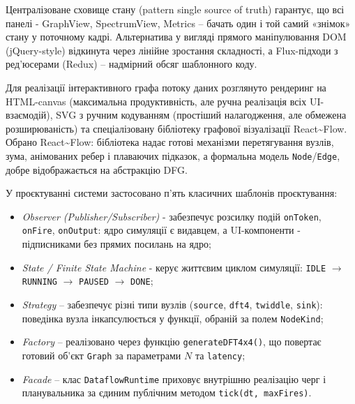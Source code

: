 \documentclass[
]{article}
\newcommand{\passthrough}[1]{#1}
\begin{document}
Централізоване сховище стану (pattern single source of truth) гарантує,
що всі панелі - GraphView, SpectrumView, Metrics -- бачать один і той
самий «знімок» стану у поточному кадрі. Альтернатива у вигляді прямого
маніпулювання DOM (jQuery-style) відкинута через лінійне зростання
складності, а Flux-підходи з ред'юсерами (Redux) -- надмірний обсяг
шаблонного коду.

Для реалізації інтерактивного графа потоку даних розглянуто рендеринг на
HTML-canvas (максимальна продуктивність, але ручна реалізація всіх
UI-взаємодій), SVG з ручним кодуванням (простіший налагодження, але
обмежена розширюваність) та спеціалізовану бібліотеку графової
візуалізації React\textasciitilde Flow. Обрано
React\textasciitilde Flow: бібліотека надає готові механізми
перетягування вузлів, зума, анімованих ребер і плаваючих підказок, а
формальна модель
\passthrough{\lstinline!Node!}/\passthrough{\lstinline!Edge!}, добре
відображається на абстракцію DFG.

У проєктуванні системи застосовано п'ять класичних шаблонів
проєктування:

\begin{itemize}
\item
  \emph{Observer (Publisher/Subscriber)} - забезпечує розсилку подій
  \passthrough{\lstinline!onToken!}, \passthrough{\lstinline!onFire!},
  \passthrough{\lstinline!onOutput!}: ядро симуляції є видавцем, а
  UI-компоненти - підписниками без прямих посилань на ядро;
\item
  \emph{State / Finite State Machine} - керує життєвим циклом симуляції:
  \passthrough{\lstinline!IDLE!} \(\rightarrow\)
  \passthrough{\lstinline!RUNNING!} \(\rightarrow\)
  \passthrough{\lstinline!PAUSED!} \(\rightarrow\)
  \passthrough{\lstinline!DONE!};
\item
  \emph{Strategy} -- забезпечує різні типи вузлів
  (\passthrough{\lstinline!source!},
  \passthrough{\lstinline!dft!}\passthrough{\lstinline!4!},
  \passthrough{\lstinline!twiddle!}, \passthrough{\lstinline!sink!}):
  поведінка вузла інкапсулюється у функції, обраній за полем
  \passthrough{\lstinline!NodeKind!};
\item
  \emph{Factory} -- реалізовано через функцію
  \passthrough{\lstinline!generateDFT!}\passthrough{\lstinline!4!}\passthrough{\lstinline!x!}\passthrough{\lstinline!4()!},
  що повертає готовий об'єкт \passthrough{\lstinline!Graph!} за
  параметрами \(N\) та \passthrough{\lstinline!latency!};
\item
  \emph{Facade} -- клас \passthrough{\lstinline!DataflowRuntime!}
  приховує внутрішню реалізацію черг і планувальника за єдиним публічним
  методом
  \passthrough{\lstinline!tick!}\passthrough{\lstinline!(!}\passthrough{\lstinline!dt!}\passthrough{\lstinline!,!}\passthrough{\lstinline! !}\passthrough{\lstinline!maxFires!}\passthrough{\lstinline!)!}.
\end{itemize}
\end{document}
